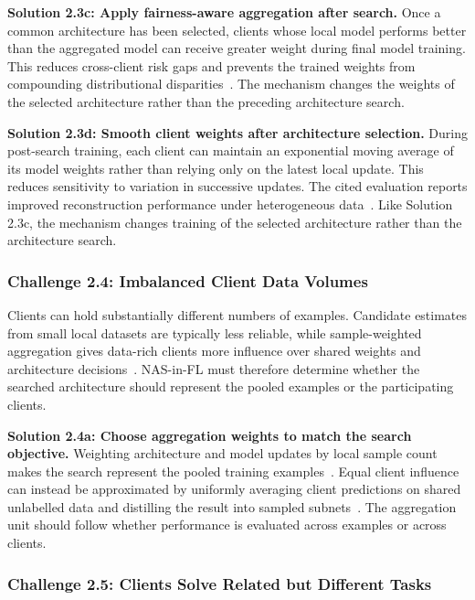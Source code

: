 \noindent\textbf{Solution 2.3c: Apply fairness-aware aggregation after search.} Once a common architecture has been selected, clients whose local model performs better than the aggregated model can receive greater weight during final model training. This reduces cross-client risk gaps and prevents the trained weights from compounding distributional disparities~\cite{mri_generalizable_reconstruction_fednas_2025}. The mechanism changes the weights of the selected architecture rather than the preceding architecture search.

\noindent\textbf{Solution 2.3d: Smooth client weights after architecture selection.} During post-search training, each client can maintain an exponential moving average of its model weights rather than relying only on the latest local update. This reduces sensitivity to variation in successive updates. The cited evaluation reports improved reconstruction performance under heterogeneous data~\cite{fed_auto_mri_2023}. Like Solution 2.3c, the mechanism changes training of the selected architecture rather than the architecture search.

\subsubsection{Challenge 2.4: Imbalanced Client Data Volumes}

Clients can hold substantially different numbers of examples. Candidate estimates from small local datasets are typically less reliable, while sample-weighted aggregation gives data-rich clients more influence over shared weights and architecture decisions~\cite{fednas_2021}. NAS-in-FL must therefore determine whether the searched architecture should represent the pooled examples or the participating clients.

\noindent\textbf{Solution 2.4a: Choose aggregation weights to match the search objective.} Weighting architecture and model updates by local sample count makes the search represent the pooled training examples~\cite{fednas_2021}. Equal client influence can instead be approximated by uniformly averaging client predictions on shared unlabelled data and distilling the result into sampled subnets~\cite{hapfnas_2025}. The aggregation unit should follow whether performance is evaluated across examples or across clients.

\subsubsection{Challenge 2.5: Clients Solve Related but Different Tasks}

